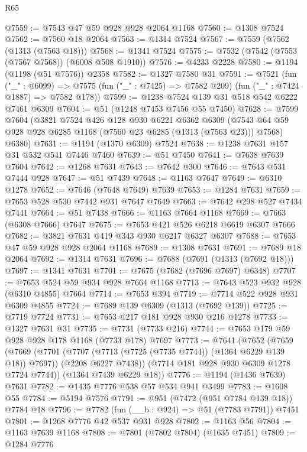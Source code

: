 \begin{lexlean}{R65}
\begin{coremodule}
@7559 := @7543 @47 @59 @928 @928 @2064 @1168
@7560 := @1308 @7524
@7562 := @7560 @18 @2064
@7563 := @1314 @7524
@7567 := @7559 (@7562 (@1313 (@7563 @18)))
@7568 := @1341 @7524
@7575 := @7532 (@7542 (@7553 (@7567 @7568)) (@6008 @508 @1910))
@7576 := @4233 @2228
@7580 := @1194 (@1198 (@51 @7576)) @2358
@7582 := @1327 @7580 @31
@7591 := @7521
    (fun ("_" : @6099) =>
    @7575 (fun ("_" : @7425) => @7582 @209) (fun ("_" : @7424 @1887) => @7582 @178))
@7599 := @1238 @7524 @139 @31 @518 @542 @6222 @7461 @6309
@7604 := @51 (@1248 @7453 @7456 @55 @7450)
@7628 := @7599
    @7604
    (@3821
      @7524
      @426
      @128
      @930
      @6221
      @6362
      @6309
      (@7543 @64 @59 @928 @928 @6285 @1168 (@7560 @23 @6285 (@1313 (@7563 @23))) @7568)
      @6380)
@7631 := @1194 (@1370 @6309) @7524
@7638 := @1238 @7631 @157 @31 @532 @541 @7446 @7460
@7639 := @51 @7450
@7641 := @7638 @7639 @7604
@7642 := @1268 @7631
@7643 := @7642 @300
@7646 := @7643 @531 @7444 @928
@7647 := @51 @7439
@7648 := @1163 @7647
@7649 := @6310 @1278
@7652 := @7646 (@7648 @7649) @7639
@7653 := @1284 @7631
@7659 := @7653 @528 @530 @7442 @931 @7647 @7649
@7663 := @7642 @298 @527 @7434 @7441
@7664 := @51 @7438
@7666 := @1163 @7664 @1168
@7669 := @7663 (@6308 @7666) @7647
@7675 := @7653 @421 @526 @6218 @6619 @6307 @7666
@7682 := @3821 @7631 @419 @343 @930 @6217 @6327 @6307
@7688 := @7653 @47 @59 @928 @928 @2064 @1168
@7689 := @1308 @7631
@7691 := @7689 @18 @2064
@7692 := @1314 @7631
@7696 := @7688 (@7691 (@1313 (@7692 @18)))
@7697 := @1341 @7631
@7701 := @7675 (@7682 (@7696 @7697) @6348)
@7707 := @7653 @524 @59 @934 @928 @7664 @1168
@7713 := @7643 @523 @932 @928 (@6310 @4855) @7664
@7714 := @7653 @394
@7719 := @7714 @522 @928 @931 @6309 @4855
@7724 := @7689 @139 @6309 (@1313 (@7692 @139))
@7725 := @7719 @7724
@7731 := @7653 @217 @181 @928 @930 @216 @1278
@7733 := @1327 @7631 @31
@7735 := @7731 (@7733 @216)
@7744 := @7653 @179 @59 @928 @928 @178 @1168 (@7733 @178) @7697
@7773 := @7641
    (@7652
      (@7659
        (@7669
          (@7701 (@7707 (@7713 (@7725 (@7735 @7744)) (@1364 @6229 @139 @18)) @7697))
          (@2208 @6227 @7438))
        (@7714 @181 @928 @930 @6309 @1278 @7724 @7744))
      (@1364 @7439 @6229 @18))
@7776 := @1194 (@1436 @7639) @7631
@7782 := @1435 @7776 @538 @57 @534 @941 @3499
@7783 := @1608 @55
@7784 := @5194 @7576
@7791 := @951 (@7472 (@951 @7784 @139 @18)) @7784 @18
@7796 := @7782 (fun (__b : @924) => @51 (@7783 @7791)) @7451
@7801 := @1268 @7776 @42 @537 @931 @928
@7802 := @1163 @56
@7804 := @1163 @7639 @1168
@7808 := @7801 (@7802 @7804) (@1635 @7451)
@7809 := @1284 @7776

\end{coremodule}
\end{lexlean}
